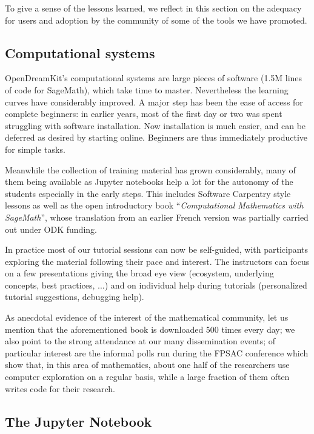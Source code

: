 \documentclass{deliverablereport}
\begin{document}
To give a sense of the lessons learned, we reflect in this section on
the adequacy for users and adoption by the community of some of the
tools we have promoted.

\subsection{Computational systems}

OpenDreamKit's computational systems are large pieces of software
(1.5M lines of code for SageMath), which take time to master.
Nevertheless the learning curves have considerably improved. A major
step has been the ease of access for complete beginners: in earlier
years, most of the first day or two was spent struggling with software
installation. Now installation is much easier, and can be deferred as
desired by starting online. Beginners are thus immediately productive
for simple tasks.

Meanwhile the collection of training material has grown considerably,
many of them being available as Jupyter notebooks help a lot for the
autonomy of the students especially in the early steps. This includes
Software Carpentry style lessons as well as the open introductory book
``\emph{Computational Mathematics with SageMath}'', whose translation
from an earlier French version was partially carried out under ODK
funding.

In practice most of our tutorial sessions can now be self-guided, with
participants exploring the material following their pace and interest.
The instructors can focus on a few presentations giving the broad eye
view (ecosystem, underlying concepts, best practices, ...) and on
individual help during tutorials (personalized tutorial suggestions,
debugging help).

As anecdotal evidence of the interest of the mathematical community,
let us mention that the aforementioned book is downloaded 500 times
every day; we also point to the strong attendance at our many
dissemination events; of particular interest are the informal polls
run during the FPSAC conference which show that, in this area of
mathematics, about one half of the researchers use computer
exploration on a regular basis, while a large fraction of them often
writes code for their research.

\subsection{The Jupyter Notebook}
\end{document}
